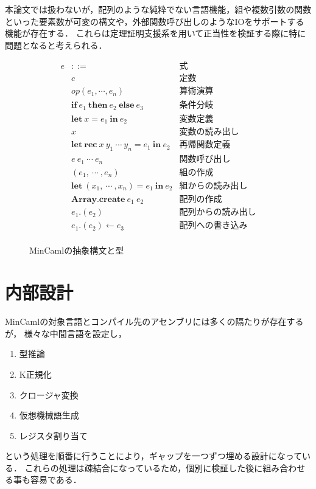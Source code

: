 \documentclass{sumiilab-paper}
\newcommand{\keyword}[1]{\mathbf{#1}}
\newcommand{\IF}{\keyword{if}}
\newcommand{\THEN}{\keyword{then}}
\newcommand{\ELSE}{\keyword{else}}
\newcommand{\LET}{\keyword{let}}
\newcommand{\REC}{\keyword{rec}}
\newcommand{\ARRAY}{\keyword{Array}}
\newcommand{\CREATE}{\keyword{create}}
\newcommand{\IN}{\keyword{in}}
\begin{document}
本論文では扱わないが，配列のような純粋でない言語機能，組や複数引数の関数といった要素数が可変の構文や，外部関数呼び出しのようなIOをサポートする機能が存在する．
これらは定理証明支援系を用いて正当性を検証する際に特に問題となると考えられる．

\begin{figure}[htbp]
	\[ \begin{array}{lll}
			e & ::= & \mbox{式} \\
				& c	& \mbox{定数} \\
			 	& \textit{op} (e_1,\cdots,e_n) & \mbox{算術演算} \\
				& \IF~e_1~\THEN~e_2~\ELSE~e_3 & \mbox{条件分岐} \\
			 	& \LET~x=e_1~\IN~e_2 & \mbox{変数定義} \\
				& x & \mbox{変数の読み出し} \\
				& \LET~\REC~x~y_1~\cdots~y_n=e_1~\IN~e_2 & \mbox{再帰関数定義} \\
				& e~e_1~\cdots~e_n & \mbox{関数呼び出し} \\
				& (e_1,~\cdots~,e_n) & \mbox{組の作成} \\
				& \LET~(x_1,~\cdots~,x_n)=e_1~\IN~e_2 & \mbox{組からの読み出し} \\
				& \ARRAY.\CREATE~e_1~e_2 & \mbox{配列の作成} \\
				& e_1.(e_2) & \mbox{配列からの読み出し} \\
				& e_1.(e_2)\leftarrow e_3 & \mbox{配列への書き込み} \\
	\end{array} \]
	\caption{MinCamlの抽象構文と型}
	\label{eqn:mincaml-ast}
\end{figure}

\section{内部設計}
MinCamlの対象言語とコンパイル先のアセンブリには多くの隔たりが存在するが，
様々な中間言語を設定し，
\begin{enumerate}
	\item 型推論
	\item K正規化
	\item クロージャ変換
	\item 仮想機械語生成
	\item レジスタ割り当て
\end{enumerate}
という処理を順番に行うことにより，ギャップを一つずつ埋める設計になっている．
これらの処理は疎結合になっているため，個別に検証した後に組み合わせる事も容易である．
\end{document}
